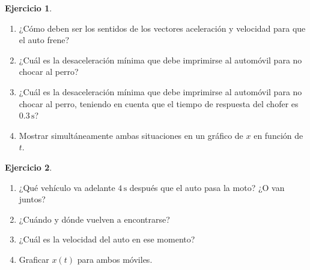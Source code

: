\documentclass[a4paper,12pt,twoside]{book}
\newtheorem{ejercicio}{{Ejercicio}}[chapter]
\begin{document}
\begin{mdframed}[style=ejercicio-intermedio]
    \begin{ejercicio}
    \end{ejercicio}
    \begin{enumerate}
        \item ¿Cómo deben ser los sentidos de los vectores aceleración y velocidad para que el auto frene?
        \item ¿Cuál es la desaceleración mínima que debe imprimirse al automóvil para no chocar al perro?
        \item ¿Cuál es la desaceleración mínima que debe imprimirse al automóvil para no chocar al perro, teniendo en cuenta que el tiempo de respuesta del chofer es $0.3\,\si{\second}$?
        \item Mostrar simultáneamente ambas situaciones en un gráfico de $x$ en función de $t$.
    \end{enumerate}
\end{mdframed}

\begin{mdframed}[style=ejercicio-intermedio]
    \begin{ejercicio}
    \end{ejercicio}
    \begin{center}
        \def\svgwidth{0.5\linewidth}
        
    \end{center}
    \begin{enumerate}
        \item ¿Qué vehículo va adelante $4\,\si{\second}$ después que el auto pasa la moto? ¿O van juntos? 
        \item ¿Cuándo y dónde vuelven a encontrarse?
        \item ¿Cuál es la velocidad del auto en ese momento?
        \item Graficar $x(t)$ para ambos móviles.
    \end{enumerate}
\end{mdframed}
\end{document}
